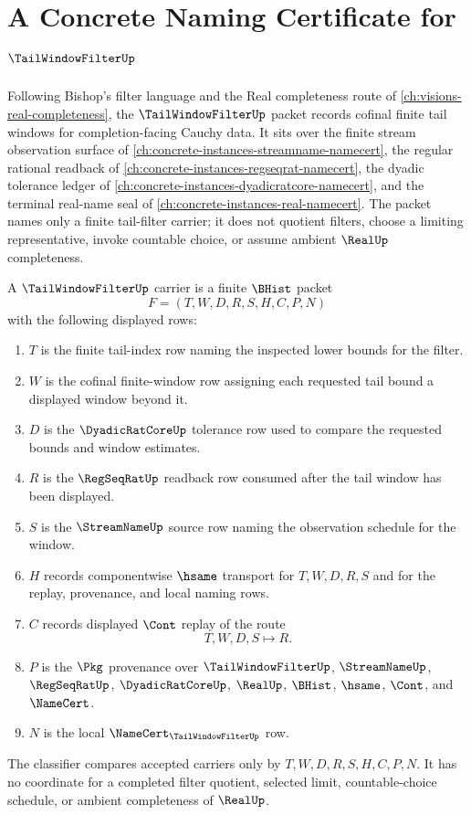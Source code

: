 \chapter{A Concrete Naming Certificate for $\TailWindowFilterUp$}
\label{ch:concrete-instances-tail-window-filter-namecert}

Following Bishop's filter language and the Real completeness route of \autoref{ch:visions-real-completeness}, the $\TailWindowFilterUp$ packet records cofinal finite tail windows for completion-facing Cauchy data. It sits over the finite stream observation surface of \autoref{ch:concrete-instances-streamname-namecert}, the regular rational readback of \autoref{ch:concrete-instances-regseqrat-namecert}, the dyadic tolerance ledger of \autoref{ch:concrete-instances-dyadicratcore-namecert}, and the terminal real-name seal of \autoref{ch:concrete-instances-real-namecert}. The packet names only a finite tail-filter carrier; it does not quotient filters, choose a limiting representative, invoke countable choice, or assume ambient $\RealUp$ completeness.

\begin{definition}
\label{def:tail-window-filter-carrier}
A $\TailWindowFilterUp$ carrier is a finite $\BHist$ packet
$$
F=(T,W,D,R,S,H,C,P,N)
$$
with the following displayed rows:
\begin{enumerate}
\item $T$ is the finite tail-index row naming the inspected lower bounds for the filter.
\item $W$ is the cofinal finite-window row assigning each requested tail bound a displayed window beyond it.
\item $D$ is the $\DyadicRatCoreUp$ tolerance row used to compare the requested bounds and window estimates.
\item $R$ is the $\RegSeqRatUp$ readback row consumed after the tail window has been displayed.
\item $S$ is the $\StreamNameUp$ source row naming the observation schedule for the window.
\item $H$ records componentwise $\hsame$ transport for $T,W,D,R,S$ and for the replay, provenance, and local naming rows.
\item $C$ records displayed $\Cont$ replay of the route
$$
T,W,D,S \longmapsto R .
$$
\item $P$ is the $\Pkg$ provenance over $\TailWindowFilterUp$, $\StreamNameUp$, $\RegSeqRatUp$, $\DyadicRatCoreUp$, $\RealUp$, $\BHist$, $\hsame$, $\Cont$, and $\NameCert$.
\item $N$ is the local $\NameCert_{\TailWindowFilterUp}$ row.
\end{enumerate}
The classifier compares accepted carriers only by $T,W,D,R,S,H,C,P,N$. It has no coordinate for a completed filter quotient, selected limit, countable-choice schedule, or ambient completeness of $\RealUp$.
\end{definition}

